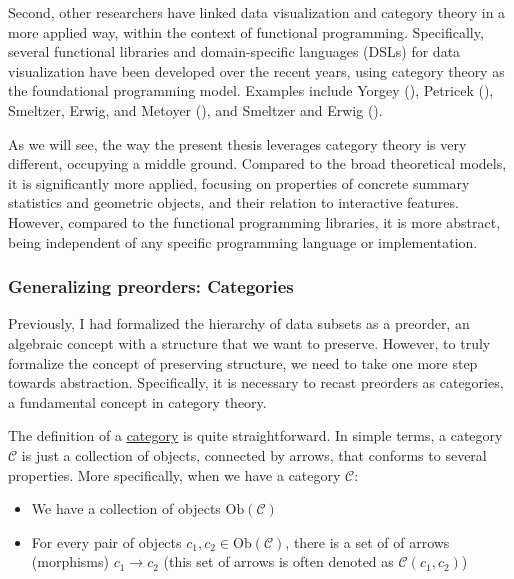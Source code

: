 \documentclass[
  openany]{book}
\providecommand{\tightlist}{%
  \setlength{\itemsep}{0pt}\setlength{\parskip}{0pt}}
\theoremstyle{definition}
\theoremstyle{definition}
\theoremstyle{definition}
\theoremstyle{definition}
\theoremstyle{remark}
\begin{document}
Second, other researchers have linked data visualization and category theory in a more applied way, within the context of functional programming. Specifically, several functional libraries and domain-specific languages (DSLs) for data visualization have been developed over the recent years, using category theory as the foundational programming model. Examples include Yorgey (), Petricek (), Smeltzer, Erwig, and Metoyer (), and Smeltzer and Erwig ().

As we will see, the way the present thesis leverages category theory is very different, occupying a middle ground. Compared to the broad theoretical models, it is significantly more applied, focusing on properties of concrete summary statistics and geometric objects, and their relation to interactive features. However, compared to the functional programming libraries, it is more abstract, being independent of any specific programming language or implementation.

\subsubsection{Generalizing preorders: Categories}\label{preorders-categories}

Previously, I had formalized the hierarchy of data subsets as a preorder, an algebraic concept with a structure that we want to preserve. However, to truly formalize the concept of preserving structure, we need to take one more step towards abstraction. Specifically, it is necessary to recast preorders as categories, a fundamental concept in category theory.

The definition of a \hyperref[categories]{category} is quite straightforward. In simple terms, a category \(\mathcal{C}\) is just a collection of objects, connected by arrows, that conforms to several properties. More specifically, when we have a category \(\mathcal{C}\):

\begin{itemize}
\tightlist
\item
  We have a collection of objects \(\text{Ob}(\mathcal{C})\)
\item
  For every pair of objects \(c_1, c_2 \in \text{Ob}(\mathcal{C})\), there is a set of of arrows (morphisms) \(c_1 \to c_2\) (this set of arrows is often denoted as \(\mathcal{C}(c_1, c_2)\))
\end{itemize}
\end{document}
